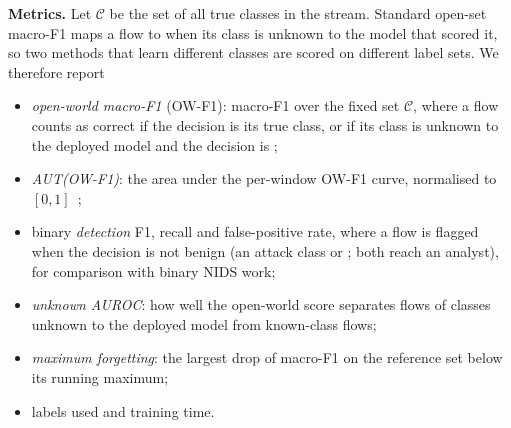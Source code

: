 \textbf{Metrics.} Let $\mathcal{C}$ be the set of all true classes in the stream. Standard open-set macro-F1 maps
a flow to \unk{} when its class is unknown to the model that scored it, so two methods that learn different
classes are scored on different label sets. We therefore report
\begin{itemize}
\item \emph{open-world macro-F1} (OW-F1): macro-F1 over the fixed set $\mathcal{C}$, where a flow counts as
      correct if the decision is its true class, or if its class is unknown to the deployed model and the decision
      is \unk{};
\item \emph{AUT(OW-F1)}: the area under the per-window OW-F1 curve, normalised to $[0,1]$~\cite{pendlebury2019tesseract};
\item binary \emph{detection} F1, recall and false-positive rate, where a flow is flagged when the decision is not
      benign (an attack class or \unk{}; both reach an analyst), for comparison with binary NIDS work;
\item \emph{unknown AUROC}: how well the open-world score separates flows of classes unknown to the deployed
      model from known-class flows;
\item \emph{maximum forgetting}: the largest drop of macro-F1 on the reference set below its running maximum;
\item labels used and training time.
\end{itemize}
